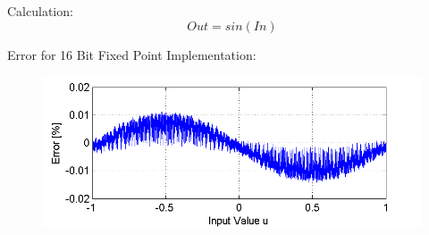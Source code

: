 Calculation:
\begin{equation*}
	Out = sin(In)
\end{equation*}

Error for 16 Bit Fixed Point Implementation:
\begin{figure}[H]
	\includegraphics[width=\textwidth]{Sin_Error}
\end{figure}


